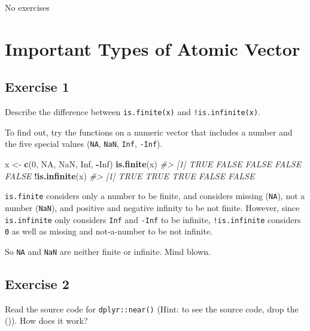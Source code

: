 \documentclass[]{book}
\newenvironment{Shaded}{\begin{snugshade}}{\end{snugshade}}
\newcommand{\CommentTok}[1]{\textcolor[rgb]{0.56,0.35,0.01}{\textit{#1}}}
\newcommand{\DecValTok}[1]{\textcolor[rgb]{0.00,0.00,0.81}{#1}}
\newcommand{\KeywordTok}[1]{\textcolor[rgb]{0.13,0.29,0.53}{\textbf{#1}}}
\newcommand{\NormalTok}[1]{#1}
\newcommand{\OperatorTok}[1]{\textcolor[rgb]{0.81,0.36,0.00}{\textbf{#1}}}
\newcommand{\OtherTok}[1]{\textcolor[rgb]{0.56,0.35,0.01}{#1}}
\newcommand{\StringTok}[1]{\textcolor[rgb]{0.31,0.60,0.02}{#1}}
\theoremstyle{plain}
\theoremstyle{remark}
\theoremstyle{definition}
\theoremstyle{definition}
\theoremstyle{definition}
\theoremstyle{remark}
\begin{document}
No exercises

\hypertarget{important-types-of-atomic-vector}{%
\section{Important Types of Atomic
Vector}\label{important-types-of-atomic-vector}}

\hypertarget{exercise-1-53}{%
\subsection{Exercise 1}\label{exercise-1-53}}

Describe the difference between \texttt{is.finite(x)} and
\texttt{!is.infinite(x)}.

To find out, try the functions on a numeric vector that includes a
number and the five special values (\texttt{NA}, \texttt{NaN},
\texttt{Inf}, \texttt{-Inf}).

\begin{Shaded}
\begin{Highlighting}[]
\NormalTok{x <-}\StringTok{ }\KeywordTok{c}\NormalTok{(}\DecValTok{0}\NormalTok{, }\OtherTok{NA}\NormalTok{, }\OtherTok{NaN}\NormalTok{, }\OtherTok{Inf}\NormalTok{, }\OperatorTok{-}\OtherTok{Inf}\NormalTok{)}
\KeywordTok{is.finite}\NormalTok{(x)}
\CommentTok{#> [1]  TRUE FALSE FALSE FALSE FALSE}
\OperatorTok{!}\KeywordTok{is.infinite}\NormalTok{(x)}
\CommentTok{#> [1]  TRUE  TRUE  TRUE FALSE FALSE}
\end{Highlighting}
\end{Shaded}

\texttt{is.finite} considers only a number to be finite, and considers
missing (\texttt{NA}), not a number (\texttt{NaN}), and positive and
negative infinity to be not finite. However, since \texttt{is.infinite}
only considers \texttt{Inf} and \texttt{-Inf} to be infinite,
\texttt{!is.infinite} considers \texttt{0} as well as missing and
not-a-number to be not infinite.

So \texttt{NA} and \texttt{NaN} are neither finite or infinite. Mind
blown.

\hypertarget{exercise-2-51}{%
\subsection{Exercise 2}\label{exercise-2-51}}

Read the source code for \texttt{dplyr::near()} (Hint: to see the source
code, drop the ()). How does it work?
\end{document}
